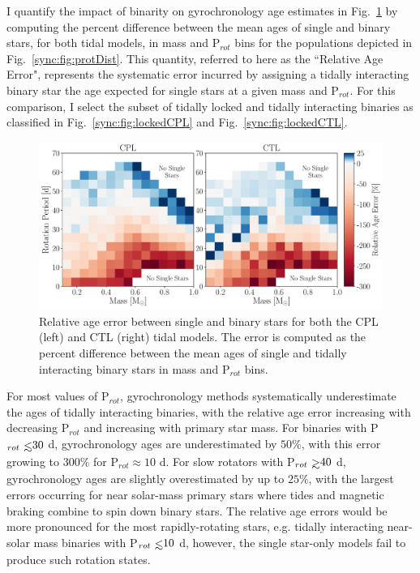 I quantify the impact of binarity on gyrochronology age estimates in Fig.~\ref{sync:fig:gyro} by computing the percent difference between the mean ages of single and binary stars, for both tidal models, in mass and P$_{rot}$ bins for the populations depicted in Fig.~\ref{sync:fig:protDist}. This quantity, referred to here as the ``Relative Age Error", represents the systematic error incurred by assigning a tidally interacting binary star the age expected for single stars at a given mass and P$_{rot}$. For this comparison, I select the subset of tidally locked and tidally interacting binaries as classified in Fig.~\ref{sync:fig:lockedCPL} and Fig.~\ref{sync:fig:lockedCTL}. 

\begin{figure}
	\includegraphics[width=\columnwidth]{gyro.pdf}
   \caption{Relative age error between single and binary stars for both the CPL (left) and CTL (right) tidal models. The error is computed as the percent difference between the mean ages of single and tidally interacting binary stars in mass and P$_{rot}$ bins.}%
    \label{sync:fig:gyro}%
\end{figure}

For most values of P$_{rot}$, gyrochronology methods systematically underestimate the ages of tidally interacting binaries, with the relative age error increasing with decreasing P$_{rot}$ and increasing with primary star mass. For binaries with P$_{rot} \lsim 30$ d, gyrochronology ages are underestimated by $50\%$, with this error growing to $300\%$ for P$_{rot} \approx 10$ d. For slow rotators with P$_{rot} \gsim 40$ d, gyrochronology ages are slightly overestimated by up to $25\%$, with the largest errors occurring for near solar-mass primary stars where tides and magnetic braking combine to spin down binary stars.  The relative age errors would be more pronounced for the most rapidly-rotating stars, e.g. tidally interacting near-solar mass binaries with P$_{rot} \lsim 10$ d, however, the single star-only models fail to produce such rotation states.


